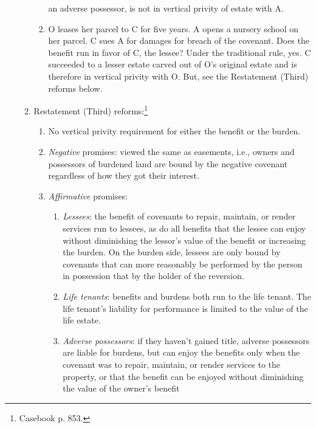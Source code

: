 \begin{enumerate}
\begin{enumerate}
\begin{enumerate}
            an adverse possessor, is not in vertical privity of estate with A.
            \item O leases her parcel to C for five years. A opens a nursery 
            school on her parcel. C sues A for damages for breach of the 
            covenant. Does the benefit run in favor of C, the lessee? Under 
            the traditional rule, yes. C succeeded to a lesser estate carved 
            out of O's original estate and is therefore in vertical privity 
            with O. But, see the Restatement (Third) reforms below.
        \end{enumerate}
        \item Restatement (Third) reforms:\footnote{Casebook p. 853.}
        \begin{enumerate}
            \item No vertical privity requirement for either the benefit or 
            the burden.
            \item \emph{Negative} promises: viewed the same as easements, 
            i.e., owners and possessors of burdened land are bound by the 
            negative covenant regardless of how they got their interest.
            \item \emph{Affirmative} promises:
            \begin{enumerate}
                \item \emph{Lessees}: the benefit of covenants to repair, 
                maintain, or render services run to lessees, as do all 
                benefits that the lessee can enjoy without diminishing the 
                lessor's value of the benefit or increasing the burden. On the 
                burden side, lessees are only bound by covenants that can more 
                reasonably be performed by the person in possession that by 
                the holder of the reversion.
                \item \emph{Life tenants}: benefits and burdens both run to 
                the life tenant. The life tenant's liability for performance 
                is limited to the value of the life estate.
                \item \emph{Adverse possessors}: if they haven't gained title, 
                adverse possessors are liable for burdens, but can enjoy the
                benefits only when the covenant was to repair, maintain, or 
                render services to the property, or that the benefit can be 
                enjoyed without diminishing the value of the owner's benefit 

\end{enumerate}
\end{enumerate}
\end{enumerate}
\end{enumerate}
